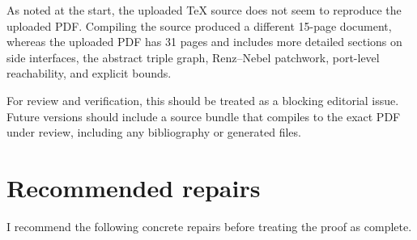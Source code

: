 \documentclass[11pt]{article}
\begin{document}
As noted at the start, the uploaded TeX source does not seem to reproduce the uploaded PDF.  Compiling the source produced a different 15-page document, whereas the uploaded PDF has 31 pages and includes more detailed sections on side interfaces, the abstract triple graph, Renz--Nebel patchwork, port-level reachability, and explicit bounds.

For review and verification, this should be treated as a blocking editorial issue.  Future versions should include a source bundle that compiles to the exact PDF under review, including any bibliography or generated files.

\section{Recommended repairs}

I recommend the following concrete repairs before treating the proof as complete.
\end{document}
